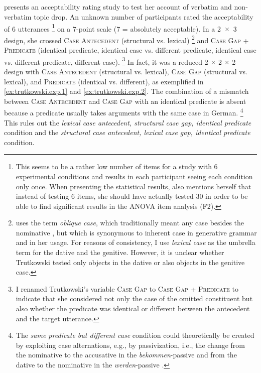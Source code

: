 \subsection{\citet{trutkowski2018}}
\citet{trutkowski2018} presents an acceptability rating study to test her account of verbatim and non-verbatim topic drop.
An unknown number of participants rated the acceptability of 6 utterances%
\footnote{This seems to be a rather low number of items for a study with 6 experimental conditions and results in each participant seeing each condition only once.
When presenting the statistical results, \citet{trutkowski2016} also mentions herself that instead of testing 6 items, she should have actually tested 30 in order to be able to find significant results in the ANOVA item analysis (F2).} 
%
on a 7-point scale (7 = absolutely acceptable).
In a 2~$\times$~3 design, she crossed \textsc{Case Antecedent} (structural vs. lexical)%
\footnote{\citet{trutkowski2018} uses the term \textit{oblique case}, which traditionally meant any case besides the nominative , but which is synonymous to inherent case  in generative grammar and in her usage.
For reasons of consistency, I use \textit{lexical case}  as the umbrella term for the dative  and the genitive. 
However, it is unclear whether Trutkowski tested only objects in the dative  or also objects in the genitive case.}
%
and \textsc{Case Gap + Predicate} (identical predicate, identical case vs. different predicate, identical case vs. different predicate, different case).%
\footnote{I renamed Trutkowski's variable \textsc{Case Gap} to \textsc{Case Gap + Predicate} to indicate that she considered not only the case of the omitted constituent but also whether the predicate was identical or different between the antecedent  and the target utterance.} 
%
In fact, it was a reduced 2 $\times$ 2 $\times$ 2 design with \textsc{Case Antecedent} (structural vs. lexical), \textsc{Case Gap} (structural vs. lexical), and \textsc{Predicate} (identical vs. different), as exemplified in \ref{ex:trutkowski.exp.1} and \ref{ex:trutkowski.exp.2}.
The combination of a mismatch between \textsc{Case Antecedent}  and \textsc{Case Gap} with an identical predicate is absent because a predicate usually takes arguments with the same case in German.%
\footnote{The \textit{same predicate but different case} condition could theoretically be created by exploiting case alternations, e.g., by passivization, i.e., the change from the nominative  to the accusative  in the \textit{bekommen}-passive and from the dative to the nominative in the \textit{werden}-passive \citep[see, e.g.,][]{wegener1990}.
}
%
This rules out the \textit{lexical case antecedent, structural case gap, identical predicate}   condition and the \textit{structural case antecedent, lexical case gap, identical predicate} condition.
 

